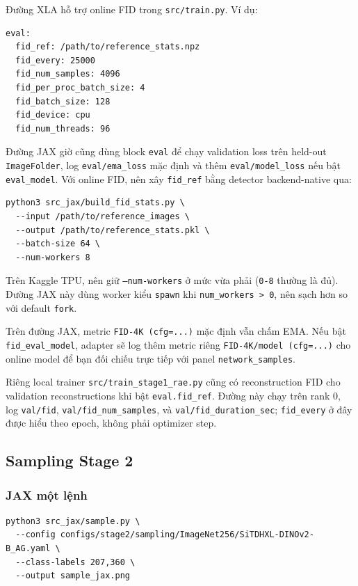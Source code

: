 Đường XLA hỗ trợ online FID trong \texttt{src/train.py}. Ví dụ:

\begin{lstlisting}[style=rae]
eval:
  fid_ref: /path/to/reference_stats.npz
  fid_every: 25000
  fid_num_samples: 4096
  fid_per_proc_batch_size: 4
  fid_batch_size: 128
  fid_device: cpu
  fid_num_threads: 96
\end{lstlisting}

Đường JAX giờ cũng dùng block \texttt{eval} để chạy validation loss trên held-out
\texttt{ImageFolder}, log \texttt{eval/ema\_loss} mặc định và thêm
\texttt{eval/model\_loss} nếu bật \texttt{eval\_model}. Với online FID, nên xây
\texttt{fid\_ref} bằng detector backend-native qua:

\begin{lstlisting}[style=rae]
python3 src_jax/build_fid_stats.py \
  --input /path/to/reference_images \
  --output /path/to/reference_stats.pkl \
  --batch-size 64 \
  --num-workers 8
\end{lstlisting}

Trên Kaggle TPU, nên giữ \texttt{--num-workers} ở mức vừa phải
(\texttt{0-8} thường là đủ). Đường JAX này dùng worker kiểu \texttt{spawn} khi
\texttt{num\_workers > 0}, nên sạch hơn so với default \texttt{fork}.

Trên đường JAX, metric \texttt{FID-4K (cfg=...)} mặc định vẫn chấm EMA. Nếu bật
\texttt{fid\_eval\_model}, adapter sẽ log thêm metric riêng
\texttt{FID-4K/model (cfg=...)} cho online model để bạn đối chiếu trực tiếp với
panel \texttt{network\_samples}.

Riêng local trainer \texttt{src/train\_stage1\_rae.py} cũng có reconstruction
FID cho validation reconstructions khi bật \texttt{eval.fid\_ref}. Đường này
chạy trên rank 0, log \texttt{val/fid}, \texttt{val/fid\_num\_samples}, và
\texttt{val/fid\_duration\_sec}; \texttt{fid\_every} ở đây được hiểu theo epoch,
không phải optimizer step.

\subsection{Sampling Stage 2}

\subsubsection{JAX một lệnh}

\begin{lstlisting}[style=rae]
python3 src_jax/sample.py \
  --config configs/stage2/sampling/ImageNet256/SiTDHXL-DINOv2-B_AG.yaml \
  --class-labels 207,360 \
  --output sample_jax.png
\end{lstlisting}

